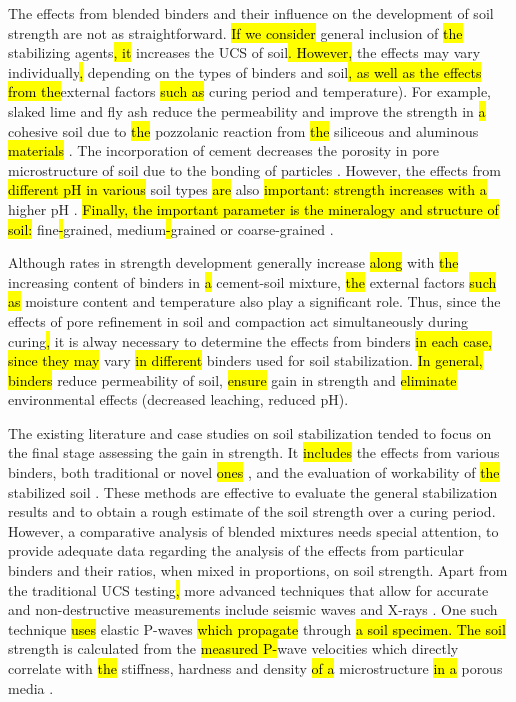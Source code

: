\documentclass[electronics,article,submit,pdftex,moreauthors]{Definitions/mdpi}
\begin{document}
The effects from blended binders and their influence on the development of soil strength are not as straightforward. \hl{If we consider }general\hl{ }inclusion of \hl{the} stabilizing agents\hl{, it }increases the UCS of soil\hl{. However, }the effects may vary individually\hl{, }depending on the types of binders and soil\hl{, as well as the effects from the}external factors\hl{ such as} curing period and temperature). For example, slaked lime and fly ash\hl{ }reduce the permeability and improve\hl{ }the strength in \hl{a} cohesive soil due to \hl{the} pozzolanic reaction from \hl{the} siliceous and aluminous \hl{materials} \cite{Sharma2012}. The incorporation of cement decreases the porosity in pore microstructure of soil due to the bonding of particles \cite{Inyang,Consoli}. However, the effects from \hl{different pH in various }soil types \hl{are} also \hl{important: strength increases with a} higher pH\hl{ }\cite{Gori,Ghobadi}. \hl{Finally, the important parameter is the mineralogy and structure of soil}\hl{: }fine\hl{-}grained, medium\hl{-}grained or coarse-grained\hl{ }\cite{Malikzada}. 

Although rates in strength development\hl{ }generally increase\hl{ along }with \hl{the} increasing content of binders in \hl{a} cement-soil mixture, \hl{the} external factors \hl{such as }moisture content and temperature\hl{ }also play a significant role. Thus, since the effects of pore refinement in soil and compaction act simultaneously during curing\hl{, }it is alway necessary to determine\hl{ }the effects from binders\hl{ in each case, since they may} vary \hl{in different} binders used for soil stabilization. \hl{In general, binders} reduce permeability of soil, \hl{ensure} gain in strength and \hl{eliminate} environmental effects (decreased leaching, reduced pH).

The existing literature and case studies on soil stabilization tended to focus on the final stage assessing the gain in strength. It \hl{includes} the effects from various binders, both traditional \citep{Boswell,Sharma2017,Sahuetal2017} or novel \hl{ones} \cite{Saffari,YadavTiwari}, and the evaluation of workability of \hl{the} stabilized soil \cite{Ogila}. These methods are effective to evaluate the general stabilization results and to obtain a rough estimate of the soil strength over a curing period. However, a comparative analysis of blended mixtures needs special attention, to provide adequate data regarding the analysis of the effects from particular binders and their ratios, when mixed in proportions, on soil strength. Apart from the traditional UCS testing\hl{, }more advanced techniques that allow for accurate and non-destructive measurements\hl{ }include seismic waves and X-rays \cite{Kierlik,Wani}. One such technique \hl{uses} elastic P-waves \hl{which propagate} through \hl{ a soil specimen. The soil} strength is calculated from the \hl{measured P-}wave velocities which directly correlate with \hl{the} stiffness, hardness and density \hl{of a} microstructure \hl{in a} porous media \cite{Fakhrabadi,Sharma2011}.
\end{document}
